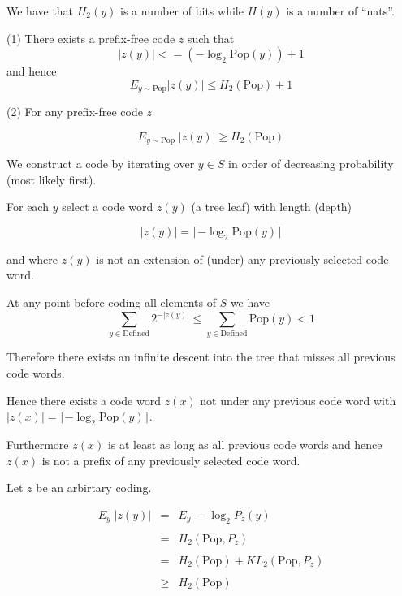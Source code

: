 {\vfill
We have that $H_2(y)$ is a number of bits while $H(y)$ is a number of ``nats''.


(1) There exists a prefix-free code $z$ such that
$$|z(y)| <= (- \log_2 \mathrm{Pop}(y)) + 1$$
and hence
$$E_{y\sim \mathrm{Pop}} |z(y)| \leq H_2(\mathrm{Pop}) +1$$

\vfill
(2) For any prefix-free code $z$

$$E_{y \sim \mathrm{Pop}}\;|z(y)| \geq H_2(\mathrm{Pop})$$


\vfill
We construct a code by iterating over $y \in S$ in order of decreasing probability (most likely first).

\vfill
For each $y$ select a code word $z(y)$ (a tree leaf) with length (depth)

\vfill
$$|z(y)| = \lceil - \log_2 \mathrm{Pop}(y)\rceil$$

\vfill
and where $z(y)$ is not an extension of (under) any previously selected code word.


At any point before coding all elements of $S$ we have
$$\sum_{y \in \mathrm{Defined}} 2^{-|z(y)|} \leq \sum_{y \in \mathrm{Defined}} \mathrm{Pop}(y) < 1$$

\vfill
Therefore there exists an infinite descent into the tree that misses all previous code words.

\vfill
Hence there exists a code word $z(x)$ not under any previous code word with
$|z(x)| = \lceil - \log_2 \mathrm{Pop}(y)\rceil$.

\vfill
Furthermore $z(x)$ is at least as long as all previous code words and hence $z(x)$ is not a prefix of any previously selected code word.


Let $z$ be an arbirtary coding.

\begin{eqnarray*}
E_y\;|z(y)| & = & E_y\; -\log_2 P_z(y) \\
\\
 & = & H_2(\mathrm{Pop},P_z) \\
 \\
 &= & H_2(\mathrm{Pop}) + KL_2(\mathrm{Pop},P_z) \\
 \\
 &\geq & H_2(\mathrm{Pop})
\end{eqnarray*}
 
}

